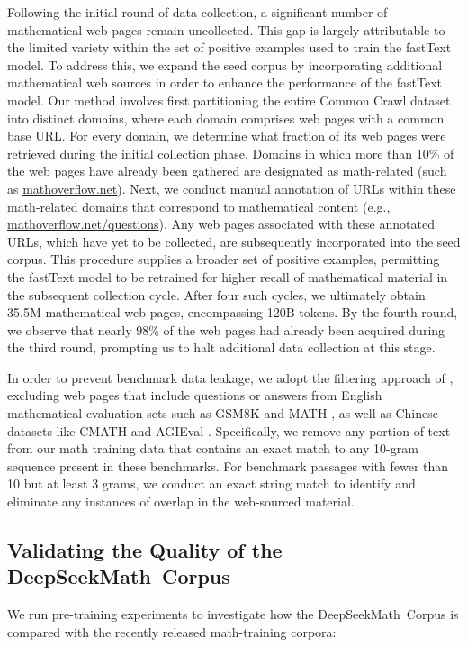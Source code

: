 \begin{itemize}[topsep=0pt]
Following the initial round of data collection, a significant number of mathematical web pages remain uncollected. This gap is largely attributable to the limited variety within the set of positive examples used to train the fastText model. To address this, we expand the seed corpus by incorporating additional mathematical web sources in order to enhance the performance of the fastText model. Our method involves first partitioning the entire Common Crawl dataset into distinct domains, where each domain comprises web pages with a common base URL. For every domain, we determine what fraction of its web pages were retrieved during the initial collection phase. Domains in which more than 10\% of the web pages have already been gathered are designated as math-related (such as \url{mathoverflow.net}). Next, we conduct manual annotation of URLs within these math-related domains that correspond to mathematical content (e.g., \url{mathoverflow.net/questions}). Any web pages associated with these annotated URLs, which have yet to be collected, are subsequently incorporated into the seed corpus. This procedure supplies a broader set of positive examples, permitting the fastText model to be retrained for higher recall of mathematical material in the subsequent collection cycle. After four such cycles, we ultimately obtain 35.5M mathematical web pages, encompassing 120B tokens. By the fourth round, we observe that nearly 98\% of the web pages had already been acquired during the third round, prompting us to halt additional data collection at this stage.

In order to prevent benchmark data leakage, we adopt the filtering approach of \cite{deepseek-coder}, excluding web pages that include questions or answers from English mathematical evaluation sets such as GSM8K \citep{gsm8k} and MATH \citep{MATH}, as well as Chinese datasets like CMATH \citep{wei2023cmath} and AGIEval \citep{agieval}. Specifically, we remove any portion of text from our math training data that contains an exact match to any 10-gram sequence present in these benchmarks. For benchmark passages with fewer than 10 but at least 3 grams, we conduct an exact string match to identify and eliminate any instances of overlap in the web-sourced material.

\subsection{Validating the Quality of the DeepSeekMath~Corpus}

We run pre-training experiments to investigate how the DeepSeekMath~Corpus is compared with the recently released math-training corpora:


\end{itemize}
